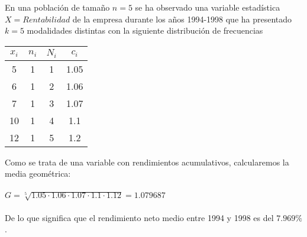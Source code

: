 En una población de tamaño $n = 5$ se ha observado una variable estadística $ X = Rentabilidad $  de la empresa durante los años 1994-1998 que ha presentado $k = 5$ modalidades distintas con la siguiente distribución de frecuencias
\\

	\begin{center}
		\begin{tabular}{| c | c | c | c | }
			\hline
			
			$x_{i}$ & $n_{i}$ & $N_{i}$ & $c_{i}$ \\ \hline
			5 & 1  & 1 & 1.05 \\
			6 & 1 & 2 & 1.06 \\
			7 & 1 & 3 & 1.07 \\
			10 & 1 & 4 & 1.1 \\
			12 & 1 & 5 & 1.2 \\ \hline
		\end{tabular}
		
	\end{center}
Como se trata de una variable con rendimientos acumulativos, calcularemos la media geométrica:
\\
\\
$ G = \sqrt[5]{1.05 \cdot 1.06 \cdot 1.07 \cdot 1.1 \cdot 1.12} = 1.079687 $
\\
\\
De lo que significa que el rendimiento neto medio entre 1994 y 1998 es del $7.969\%$.
